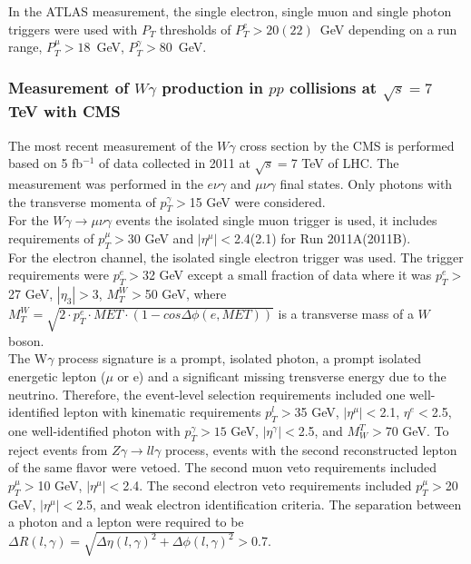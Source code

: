 In the ATLAS measurement, the single electron, single muon and single photon triggers were used with $P_T$ thresholds of $P_T^e>20(22)$~GeV depending on a run range, $P_T^\mu>18$~GeV, $P_T^\gamma>80$~GeV.\\

\subsubsection{Measurement of $W\gamma$ production in $pp$ collisions at $\sqrt{s}=7$ TeV with CMS}

The most recent measurement of the $W\gamma$ cross section by the CMS is performed based on 5 fb$^{-1}$ of data collected in 2011 at $\sqrt{s}=$7 TeV of LHC. The measurement was performed in the $e\nu\gamma$ and $\mu\nu\gamma$ final states. Only photons with the transverse momenta of $p_T^{\gamma}>$15 GeV were considered.\\



For the $W\gamma\rightarrow\mu\nu\gamma$ events the isolated single muon trigger is used, it includes requirements of $p_T^{\mu}>$30 GeV and $|\eta^{\mu}|<$2.4(2.1) for Run 2011A(2011B).\\
 
For the electron channel, the isolated single electron trigger was used. The trigger requirements were $p_T^e>$32 GeV except a small fraction of data where it was $p_T^e>$27 GeV, $|\eta_3|>$3, $M_T^W>$50 GeV, where $M_T^W=\sqrt{2 \cdot p_T^e \cdot MET \cdot (1-cos\Delta\phi(e,MET))}$ is a transverse mass of a $W$ boson.\\

The W$\gamma$ process signature is a prompt, isolated photon, a prompt isolated energetic lepton ($\mu$ or e) and a significant missing trensverse energy due to the neutrino. Therefore, the event-level selection requirements included one well-identified lepton with kinematic requirements $p_T^l>$35 GeV, $|\eta^\mu|<$2.1, $\eta^e<$2.5, one well-identified photon with $p_T^\gamma>15$ GeV, $|\eta^\gamma|<$2.5, and $M_W^T>$70 GeV. To reject events from $Z\gamma\rightarrow ll\gamma$ process, events with the second reconstructed lepton of the same flavor were vetoed. The second muon veto requirements included $p_T^\mu>$10 GeV, $|\eta^\mu|<$2.4. The second electron veto requirements included $p_T^\mu>$20 GeV, $|\eta^\mu|<$2.5, and weak electron identification criteria. The separation between a photon and a lepton were required to be $\Delta R(l,\gamma) = \sqrt{\Delta \eta(l,\gamma)^2 + \Delta \phi(l,\gamma)^2}>$0.7.\\  

